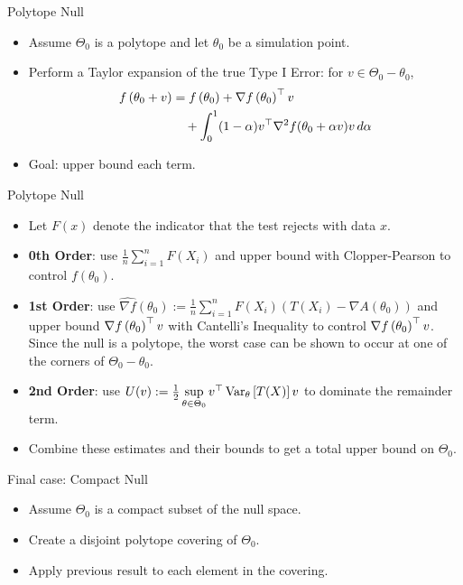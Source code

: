 \begin{frame}{Polytope Null}
\begin{itemize}
    \item Assume $\Theta_0$ is a polytope and let $\theta_0$ be a simulation point. 
    \item Perform a Taylor expansion of the true Type I Error: for $v \in \Theta_0-\theta_0$,
        \begin{align*}
            f\left( \theta_0 + v \right) &= f\left( \theta_0 \right) + \nabla f\left( \theta_0 \right)^\top v 
            \\&\quad + \int_0^1 (1-\alpha) v^\top \nabla^2 f(\theta_0 + \alpha v) v \, d\alpha
        \end{align*}
    \item Goal: upper bound each term.
\end{itemize}
\end{frame}

\begin{frame}{Polytope Null}
\begin{itemize}
    \item Let $F(x)$ denote the indicator that the test rejects with data $x$.
    \item \textbf{0th Order}: use $\frac{1}{n} \sum\limits_{i=1}^n F(X_i)$ and upper bound with Clopper-Pearson to control $f(\theta_0)$.
    \item \textbf{1st Order}: use $\widehat{\nabla f}(\theta_0) := \frac{1}{n} \sum\limits_{i=1}^n F(X_i) (T(X_i) - \nabla A(\theta_0))$
        and upper bound $\nabla f\left( \theta_0 \right)^\top v$ with Cantelli's Inequality to control $\nabla f\left( \theta_0 \right)^\top v$.
        Since the null is a polytope, the worst case can be shown to occur at one of the corners of $\Theta_0-\theta_0$.
    \item \textbf{2nd Order}: use $U(v) := \frac{1}{2} \sup\limits_{\theta \in \Theta_0} v^\top \operatorname{Var}_\theta\left[T(X)\right] v$ 
        to dominate the remainder term.
    \item Combine these estimates and their bounds to get a total upper bound on $\Theta_0$.
\end{itemize}
\end{frame}

\begin{frame}{Final case: Compact Null}
\begin{itemize}
    \item Assume $\Theta_0$ is a compact subset of the null space.
    \item Create a disjoint polytope covering of $\Theta_0$.
    \item Apply previous result to each element in the covering.
\end{itemize}
\end{frame}

